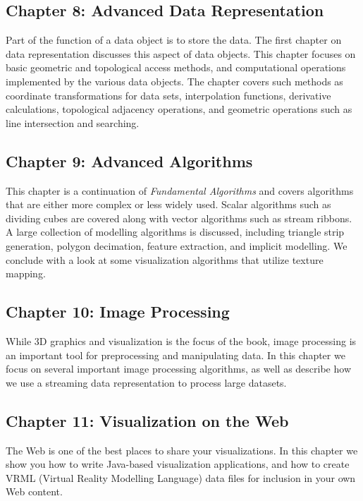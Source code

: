 \subsection*{Chapter 8: Advanced Data Representation}

Part of the function of a data object is to store the data. The first chapter on data representation discusses this aspect of data objects. This chapter focuses on basic geometric and topological access methods, and computational operations implemented by the various data objects. The chapter covers such methods as coordinate transformations for data sets, interpolation functions, derivative calculations, topological adjacency operations, and geometric operations such as line intersection and searching.

\subsection*{Chapter 9: Advanced Algorithms}

This chapter is a continuation of \emph{Fundamental Algorithms} and covers algorithms that are either more complex or less widely used. Scalar algorithms such as dividing cubes are covered along with vector algorithms such as stream ribbons. A large collection of modelling algorithms is discussed, including triangle strip generation, polygon decimation, feature extraction, and implicit modelling. We conclude with a look at some visualization algorithms that utilize texture mapping.

\subsection*{Chapter 10: Image Processing}

While 3D graphics and visualization is the focus of the book, image processing is an important tool for preprocessing and manipulating data. In this chapter we focus on several important image processing algorithms, as well as describe how we use a streaming data representation to process large datasets. 

\subsection*{Chapter 11: Visualization on the Web}

The Web is one of the best places to share your visualizations. In this chapter we show you how to write Java-based visualization applications, and how to create VRML (Virtual Reality Modelling Language) data files for inclusion in your own Web content.


